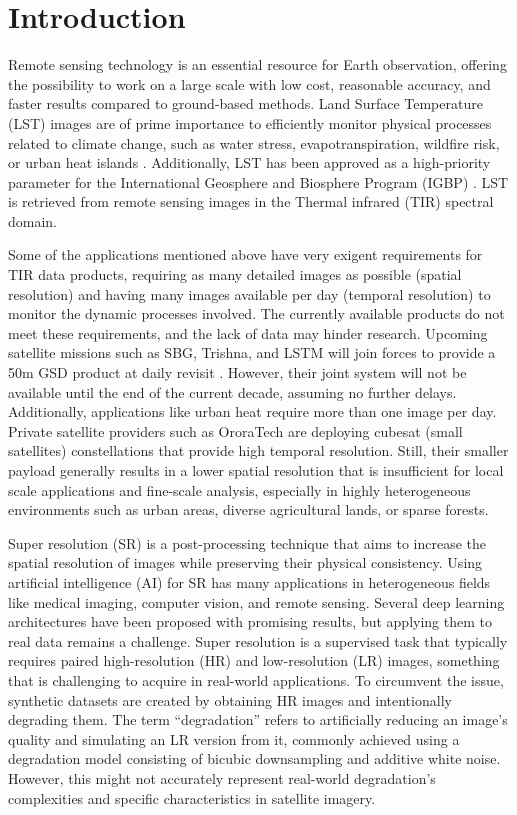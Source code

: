 \section{Introduction} \label{sec:intro}


Remote sensing technology is an essential resource for Earth observation, offering the possibility to work on a large scale with low cost, reasonable accuracy, and faster results compared to ground-based methods. Land Surface Temperature (LST) images are of prime importance to efficiently monitor physical processes related to climate change, such as water stress, evapotranspiration, wildfire risk, or urban heat islands \cite{lst2005}.
Additionally, LST has been approved as a high-priority parameter for the International Geosphere and Biosphere Program (IGBP) \cite{townshend94}. LST is retrieved from remote sensing images in the Thermal infrared (TIR) spectral domain. 

Some of the applications mentioned above have very exigent requirements for TIR data products, requiring as many detailed images as possible (spatial resolution) and having many images available per day (temporal resolution) to monitor the dynamic processes involved.
The currently available products do not meet these requirements, and the lack of data may hinder research. Upcoming satellite missions such as SBG, Trishna, and LSTM will join forces to provide a 50m GSD product at daily revisit \cite{author2023thermal}. However, their joint system will not be available until the end of the current decade, assuming no further delays. Additionally, applications like urban heat require more than one image per day.
Private satellite providers such as OroraTech are deploying cubesat (small satellites) constellations that provide high temporal resolution. Still, their smaller payload generally results in a lower spatial resolution that is insufficient for local scale applications and fine-scale analysis, especially in highly heterogeneous environments such as urban areas, diverse agricultural lands, or sparse forests.

Super resolution (SR) is a post-processing technique that aims to increase the spatial resolution of images while preserving their physical consistency.
Using artificial intelligence (AI) for SR has many applications in heterogeneous fields like medical imaging, computer vision, and remote sensing. Several deep learning architectures have been proposed with promising results, but applying them to real data remains a challenge. 
Super resolution is a supervised task that typically requires paired high-resolution (HR) and low-resolution (LR) images, something that is challenging to acquire in real-world applications. To circumvent the issue, synthetic datasets are created by obtaining HR images and intentionally degrading them. The term ``degradation'' refers to artificially reducing an image's quality and simulating an LR version from it, commonly achieved using a degradation model consisting of bicubic downsampling and additive white noise. However, this might not accurately represent real-world degradation's complexities and specific characteristics in satellite imagery.

